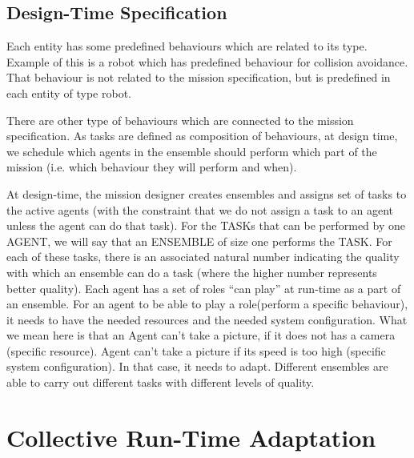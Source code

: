 \documentclass[journal]{IEEEtran}
\theoremstyle{definition}
\begin{document}
\subsection{Design-Time Specification}
Each entity has some predefined behaviours which are related to its type. Example of this is a robot which has predefined behaviour for collision avoidance. That behaviour is not related to the mission specification, but is predefined in each entity of type robot. 

There are other type of behaviours which are connected to the mission specification. As tasks are defined as composition of behaviours, at design time, we schedule which agents in the ensemble should perform which part of the mission  (i.e. which behaviour they will perform and when). 

At design-time, the mission designer creates ensembles and assigns set of tasks to the active agents  (with the constraint that we do not assign a task to an agent unless the agent can do that task). For the TASKs that can be performed by one AGENT, we will say that an ENSEMBLE of size one performs the TASK. 
For each of these tasks, there is an associated natural number indicating the quality with which an ensemble can do a task (where the higher number represents better quality). 
Each agent has a set of roles “can play” at run-time as a part of an ensemble. For an agent to be able to play a role(perform a specific behaviour), it needs to have the needed resources and the needed system configuration. What we mean here is that an Agent can't take a picture, if it does not has a camera (specific resource). Agent can't take a picture if its speed is too high (specific system configuration). In that case, it needs to adapt.
Different ensembles are able to carry out different tasks with different levels of quality. %

\section{Collective Run-Time Adaptation}
\end{document}
